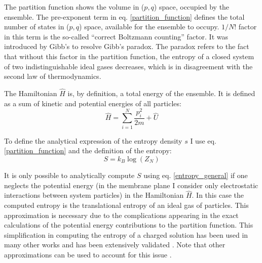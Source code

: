 The partition function shows the volume in ($p,q$) space, occupied by the ensemble. The pre-exponent term in eq. \eqref{partition_function} defines the total number of states in ($p,q$) space, available for the ensemble to occupy. $1/N!$ factor in this term is the so-called ``correct Boltzmann counting'' factor. It was introduced by Gibb's to resolve Gibb's paradox. The paradox refers to the fact that without this factor in the partition function, the entropy of a closed system of two indistinguishable ideal gases decreases, which is in disagreement with the second law of thermodynamics.

The Hamiltonian $\hat{H}$ is, by definition, a total energy of the ensemble. It is defined as a sum of kinetic and potential energies of all particles:
\begin{equation}
 \label{hamiltonian}\hat{H} = \sum_{i=1}^N \frac{p_i^2}{2m} + \hat{U}
\end{equation}

To define the analytical expression of the entropy density $s$ I use eq. \eqref{partition_function} and the definition of the entropy:
\begin{equation}
 \label{entropy_general} S=k_B \log(Z_N)
\end{equation}

It is only possible to analytically compute $S$ using eq. \eqref{entropy_general} if one neglects the potential energy (in the membrane plane I consider only electrostatic interactions between system particles) in the Hamiltonian $\hat{H}$. In this case the computed entropy is the translational entropy of an ideal gas of particles. This approximation is necessary due to the complications appearing in the exact calculations of the potential energy contributions to the partition function. This simplification in computing the entropy of a charged solution has been used in many other works and has been extensively validated \cite{Haleva2004,May2000,Khelashvili2008}. Note that other approximations can be used to account for this issue \cite{Laird1994}.


